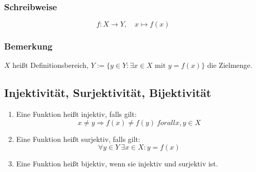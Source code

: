 \subsubsection{Schreibweise}
\begin{equation*}
    f: X \rightarrow Y,\quad x \mapsto f(x)
\end{equation*}


\subsubsection{Bemerkung}
$X$ heißt Definitionsbereich, $Y := \{y \in Y: \exists x \in X \text{ mit }
y=f(x)\}$ die Zielmenge.

\subsection{Injektivität, Surjektivität, Bijektivität}
\begin{enumerate}[label= (\alph*)]
    \item Eine Funktion heißt injektiv, falls gilt:
        \begin{equation*}
            x \neq y \Rightarrow f(x) \neq f(y)\ forall x,y\in X
        \end{equation*}
    \item Eine Funktion heißt surjektiv, falls gilt:
         \begin{equation*}
            \forall y \in Y\ \exists x \in X: y=f(x)
         \end{equation*}
     \item Eine Funktion heißt bijektiv, wenn sie injektiv und
        surjektiv ist.
\end{enumerate}
